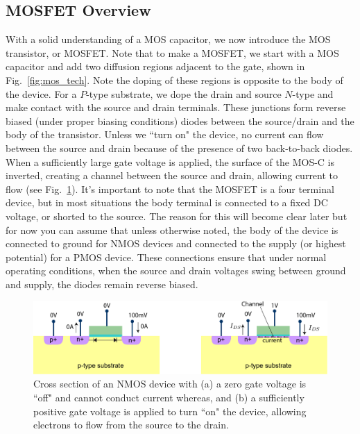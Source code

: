 \subsection{MOSFET Overview}
With a solid understanding of a MOS capacitor, we now introduce the MOS transistor, or MOSFET.  Note that to make a MOSFET, we start with a MOS capacitor and add two diffusion regions adjacent to the gate, shown in Fig.~\ref{fig:mos_tech}.  Note the doping of these regions is opposite to the body of the device.  For a $P$-type substrate, we dope the drain and source $N$-type and make contact with the source and drain terminals.  These junctions form reverse biased (under proper biasing conditions) diodes between the source/drain and the body of the transistor.  Unless we ``turn on" the device, no current can flow between the source and drain because of the presence of two back-to-back diodes.  When a sufficiently large gate voltage is applied, the surface of the MOS-C is inverted, creating a channel between the source and drain, allowing current to flow (see Fig.~\ref{fig:mos_current}).    
It's important to note that the MOSFET is a four terminal device, but in most situations the body terminal is connected to a fixed DC voltage, or shorted to the source.  The reason for this will become clear later but for now you can assume that unless otherwise noted, the body of the device is connected to ground for NMOS devices and connected to the supply (or highest potential) for a PMOS device.  These connections ensure that under normal operating conditions, when the source and drain voltages swing between ground and supply, the diodes remain reverse biased.
\begin{figure}[tb]
\centering
\includegraphics[width=\columnwidth]{mostfetxsect_current} 
\caption{Cross section of an NMOS device with (a) a zero gate voltage is ``off" and cannot conduct current whereas, and (b) a sufficiently positive gate voltage is applied to turn ``on" the device, allowing electrons to flow from the source to the drain.}
\label{fig:mos_current}
\end{figure}
